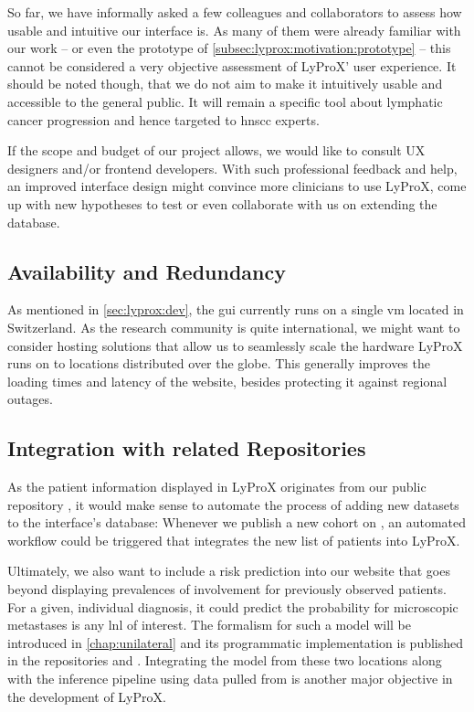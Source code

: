 \documentclass[\relativeRoot/main.tex]{subfiles}
\begin{document}
So far, we have informally asked a few colleagues and collaborators to assess how usable and intuitive our interface is. As many of them were already familiar with our work -- or even the prototype of \cref{subsec:lyprox:motivation:prototype} -- this cannot be considered a very objective assessment of LyProX' user experience. It should be noted though, that we do not aim to make it intuitively usable and accessible to the general public. It will remain a specific tool about lymphatic cancer progression and hence targeted to \gls{hnscc} experts.

If the scope and budget of our project allows, we would like to consult UX designers and/or frontend developers. With such professional feedback and help, an improved interface design might convince more clinicians to use LyProX, come up with new hypotheses to test or even collaborate with us on extending the database.

\subsection*{Availability and Redundancy}

As mentioned in \cref{sec:lyprox:dev}, the \gls{gui} currently runs on a single \gls{vm} located in Switzerland. As the research community is quite international, we might want to consider hosting solutions that allow us to seamlessly scale the hardware LyProX runs on to locations distributed over the globe. This generally improves the loading times and latency of the website, besides protecting it against regional outages.

\subsection*{Integration with related Repositories}

As the patient information displayed in LyProX originates from our public repository , it would make sense to automate the process of adding new datasets to the interface's database: Whenever we publish a new cohort on , an automated workflow could be triggered that integrates the new list of patients into LyProX.

Ultimately, we also want to include a risk prediction into our website that goes beyond displaying prevalences of involvement for previously observed patients. For a given, individual diagnosis, it could predict the probability for microscopic metastases is any \gls{lnl} of interest. The formalism for such a model will be introduced in \cref{chap:unilateral} and its programmatic implementation is published in the repositories  and . Integrating the model from these two locations along with the inference pipeline using data pulled from  is another major objective in the development of LyProX.
\end{document}
